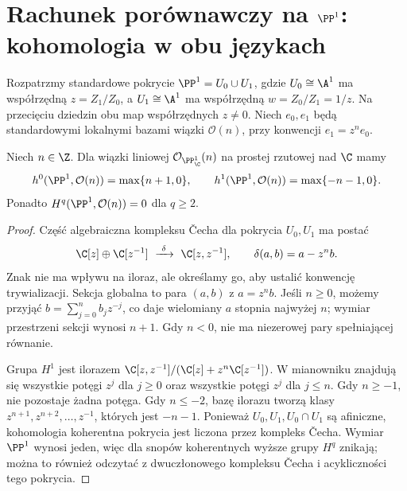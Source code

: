 \section[Rachunek porównawczy na P1: kohomologia w obu językach]{Rachunek porównawczy na $\PP^1$: kohomologia w obu językach}
\label{sec:ga9-p1-cech}

Rozpatrzmy standardowe pokrycie $\PP^1=U_0\cup U_1$,
gdzie $U_0\cong\A^1$ ma współrzędną $z=Z_1/Z_0$,
a $U_1\cong\A^1$ ma współrzędną $w=Z_0/Z_1=1/z$.
Na przecięciu dziedzin obu map współrzędnych $z\ne0$.
Niech $e_0,e_1$ będą standardowymi lokalnymi bazami
wiązki $\mathcal O(n)$, przy konwencji $e_1=z^n e_0$.

\begin{stwierdzenie}
\label{st:ga9-p1-coh}
Niech $n\in\Z$. Dla wiązki liniowej $\mathcal O_{\PP^1_\C}(n)$
na prostej rzutowej nad $\C$ mamy
\[
 h^0(\PP^1,\mathcal O(n))=\max\{n+1,0\},\qquad
 h^1(\PP^1,\mathcal O(n))=\max\{-n-1,0\}.
\]
Ponadto $H^q(\PP^1,\mathcal O(n))=0$ dla $q\ge2$.
\end{stwierdzenie}
\begin{proof}
Część algebraiczna kompleksu Čecha dla pokrycia
$U_0,U_1$ ma postać
\[
 \C[z]\oplus\C[z^{-1}]
 \ \xrightarrow{\ \delta\ }\ \C[z,z^{-1}],\qquad
 \delta(a,b)=a-z^n b.
\]
Znak nie ma wpływu na iloraz, ale określamy go,
aby ustalić konwencję trywializacji. Sekcja globalna
to para $(a,b)$ z $a=z^n b$. Jeśli $n\ge0$,
możemy przyjąć $b=\sum_{j=0}^n b_jz^{-j}$,
co daje wielomiany $a$ stopnia najwyżej $n$;
wymiar przestrzeni sekcji wynosi $n+1$. Gdy $n<0$,
nie ma niezerowej pary spełniającej równanie.

Grupa $H^1$ jest ilorazem
$\C[z,z^{-1}]/(\C[z]+z^n\C[z^{-1}])$.
W mianowniku znajdują się wszystkie potęgi $z^j$
dla $j\ge0$ oraz wszystkie potęgi $z^j$ dla $j\le n$.
Gdy $n\ge-1$, nie pozostaje żadna potęga. Gdy
$n\le-2$, bazę ilorazu tworzą klasy
$z^{n+1},z^{n+2},\ldots,z^{-1}$, których jest $-n-1$.
Ponieważ $U_0,U_1,U_0\cap U_1$ są afiniczne,
kohomologia koherentna pokrycia jest liczona
przez kompleks Čecha. Wymiar $\PP^1$ wynosi jeden,
więc dla snopów koherentnych wyższe grupy $H^q$
znikają; można to również odczytać z dwuczłonowego
kompleksu Čecha i acykliczności tego pokrycia.
\end{proof}

